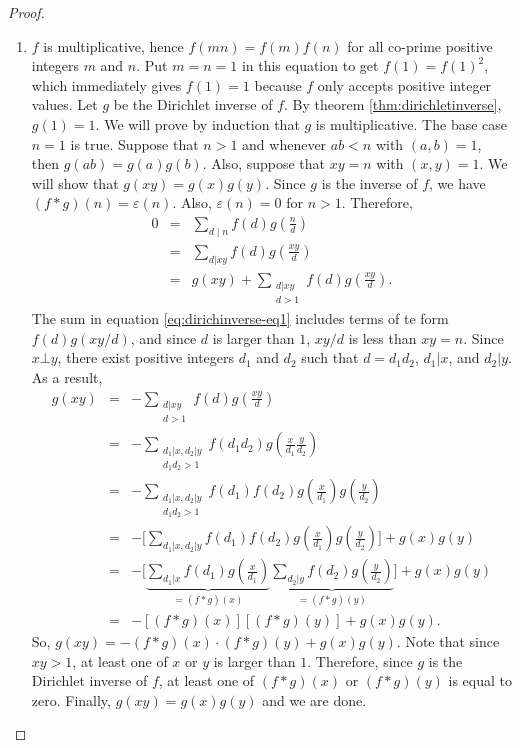 \documentclass[12pt]{subfile}
\begin{document}
\begin{proof}
\begin{enumerate}
				\item $f$ is multiplicative, hence $f(mn)=f(m)f(n)$ for all co-prime positive integers $m$ and $n$. Put $m=n=1$ in this equation to get $f(1)=f(1)^2$, which immediately gives $f(1)=1$ because $f$ only accepts positive integer values. Let $g$ be the Dirichlet inverse of $f$. By theorem \ref{thm:dirichletinverse}, $g(1)=1$. We will prove by induction that $g$ is multiplicative. The base case $n=1$ is true. Suppose that $n>1$ and whenever $ab<n$ with $(a,b)=1$, then $g(ab)=g(a)g(b)$. Also, suppose that $xy=n$ with $(x,y)=1$. We will show that $g(xy)=g(x)g(y)$. Since $g$ is the inverse of $f$, we have $(f \ast g)(n) = \varepsilon(n)$. Also, $\varepsilon(n)=0$ for $n>1$. Therefore,
					\begin{eqnarray}
						0 &=& \sum_{d\mid n} f(d) g\left(\frac{n}{d}\right)\nonumber\\
						  &=& \sum_{d|xy} f(d) g\left(\frac{xy}{d}\right) \nonumber\\
						  &=& g(xy) + \sum\limits_{\substack{d|xy \\ d>1}} f(d) g\left(\frac{xy}{d}\right).\label{eq:dirichinverse-eq1}
					\end{eqnarray}
				The sum in equation \ref{eq:dirichinverse-eq1} includes terms of te form $f(d)g(xy/d)$, and since $d$ is larger than $1$, $xy/d$ is less than $xy=n$. Since $x \bot y$, there exist positive integers $d_1$ and $d_2$ such that $d=d_1d_2$, $d_1|x$, and $d_2|y$. As a result,
					\begin{eqnarray*}
						g(xy) &=& - \sum\limits_{\substack{d|xy \\ d>1}} f(d) g\left(\frac{xy}{d}\right)\\
							  &=& - \sum\limits_{\substack{d_1|x, d_2|y \\ d_1d_2>1}} f(d_1d_2) g\left(\frac{x}{d_1} \frac{y}{d_2}\right)\\
							  &=& - \sum\limits_{\substack{d_1|x, d_2|y \\ d_1d_2>1}} f(d_1)f(d_2) g\left(\frac{x}{d_1}\right) g\left(\frac{y}{d_2}\right)\\
							  &=& - \bigg[\sum\limits_{d_1|x, d_2|y} f(d_1)f(d_2) g\left(\frac{x}{d_1}\right) g\left(\frac{y}{d_2}\right)\bigg] + g(x)g(y)\\
							  &=& - \bigg[\underbrace{\sum\limits_{d_1|x} f(d_1) g\left(\frac{x}{d_1}\right)}_{=(f \ast g)(x)} \underbrace{\sum\limits_{d_2|y} f(d_2) g\left(\frac{y}{d_2}\right)}_{=(f \ast g)(y)} \bigg] + g(x)g(y)\\
							  &=& -\left[(f \ast g)(x)\right] \left[(f\ast g)(y)\right] + g(x)g(y).
					\end{eqnarray*}
				So, $g(xy)= -(f \ast g)(x) \cdot (f\ast g)(y) + g(x)g(y)$. Note that since $xy>1$, at least one of $x$ or $y$ is larger than $1$. Therefore, since $g$ is the Dirichlet inverse of $f$, at least one of $(f \ast g)(x)$ or $(f \ast g)(y)$ is equal to zero. Finally, $g(xy)=g(x)g(y)$ and we are done.


\end{enumerate}
\end{proof}
\end{document}

